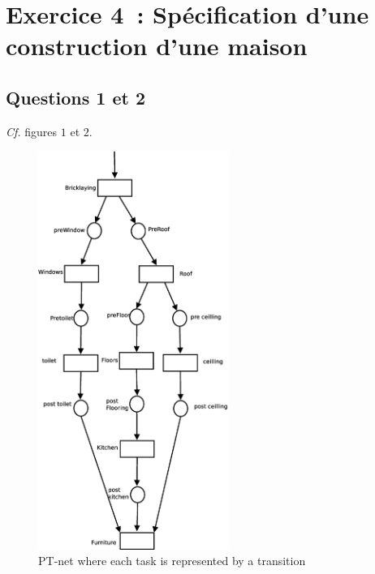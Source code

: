\section*{Exercice 4~: Spécification d'une construction d'une maison}

\subsection*{Questions 1 et 2}

\textit{Cf.} figures $1$ et $2$.

\begin{figure}[h!]
\begin{center}
\includegraphics[height = 13cm]{exo41.eps} 
\caption{PT-net where each task is represented by a transition}
\end{center} 
\end{figure} 



